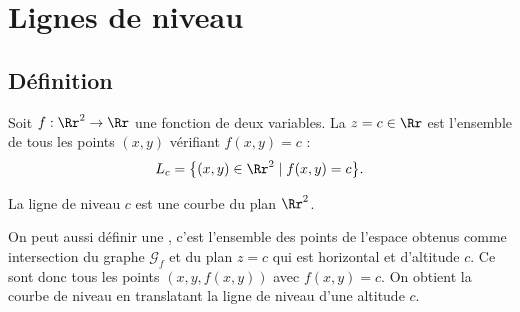 \section{Lignes de niveau}


\subsection{Définition}

\begin{definition}{}{}
	Soit $f : \Rr^2 \to \Rr$ une fonction de deux variables. 
	La  $z=c\in \Rr$ est l'ensemble de tous les points $(x,y)$ vérifiant $f(x,y)=c$ :
	$$L_c =\big\{(x,y)\in \Rr^2 \mid f(x,y)=c \big\}.$$
\end{definition}

La ligne de niveau $c$ est une courbe du plan $\Rr^2$. 

On peut aussi définir une , c'est l'ensemble des points de l'espace obtenus comme intersection du graphe $\mathcal{G}_f$ et du plan $z=c$ qui est horizontal et \og{}d'altitude\fg{} $c$. Ce sont donc tous les points $(x,y,f(x,y))$ avec $f(x,y)=c$. On obtient la courbe de niveau en translatant la ligne de niveau d'une altitude $c$.



